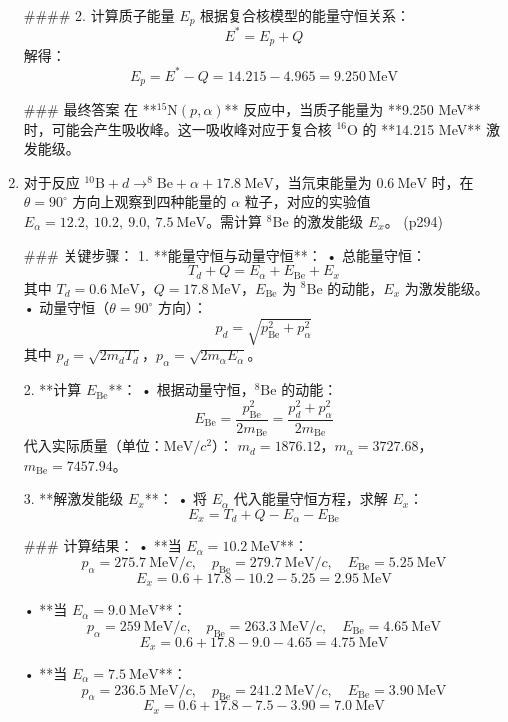 \documentclass{article}
\begin{document}
\begin{enumerate}
#### 2. 计算质子能量 \(E_p\)
根据复合核模型的能量守恒关系：
\[
E^* = E_p + Q
\]
解得：
\[
E_p = E^* - Q = 14.215 - 4.965 = 9.250 \, \text{MeV}
\]


### 最终答案
在 **\(^{15}\text{N}(p, \alpha)\)** 反应中，当质子能量为 **9.250 MeV** 时，可能会产生吸收峰。这一吸收峰对应于复合核 \(^{16}\text{O}\) 的 **14.215 MeV** 激发能级。
\item
对于反应 \(^{10}\text{B} + d \rightarrow ^{8}\text{Be} + \alpha + 17.8\ \text{MeV}\)，当氘束能量为 \(0.6\ \text{MeV}\) 时，在 \(\theta = 90^\circ\) 方向上观察到四种能量的 \(\alpha\) 粒子，对应的实验值 \(E_\alpha = 12.2,\ 10.2,\ 9.0,\ 7.5\ \text{MeV}\)。需计算 \(^{8}\text{Be}\) 的激发能级 \(E_x\)。   (p294)

### 关键步骤：
1. **能量守恒与动量守恒**：
   • 总能量守恒：  
     \[
     T_d + Q = E_\alpha + E_{\text{Be}} + E_x
     \]
     其中 \(T_d = 0.6\ \text{MeV}\)，\(Q = 17.8\ \text{MeV}\)，\(E_{\text{Be}}\) 为 \(^{8}\text{Be}\) 的动能，\(E_x\) 为激发能级。
   • 动量守恒（\(\theta = 90^\circ\) 方向）：  
     \[
     p_d = \sqrt{p_{\text{Be}}^2 + p_\alpha^2}
     \]
     其中 \(p_d = \sqrt{2 m_d T_d}\)，\(p_\alpha = \sqrt{2 m_\alpha E_\alpha}\)。

2. **计算 \(E_{\text{Be}}\)**：
   • 根据动量守恒，\(^{8}\text{Be}\) 的动能：  
     \[
     E_{\text{Be}} = \frac{p_{\text{Be}}^2}{2 m_{\text{Be}}} = \frac{p_d^2 + p_\alpha^2}{2 m_{\text{Be}}}
     \]
     代入实际质量（单位：\(\text{MeV}/c^2\)）：  
     \(m_d = 1876.12\)，\(m_\alpha = 3727.68\)，\(m_{\text{Be}} = 7457.94\)。

3. **解激发能级 \(E_x\)**：
   • 将 \(E_\alpha\) 代入能量守恒方程，求解 \(E_x\)：  
     \[
     E_x = T_d + Q - E_\alpha - E_{\text{Be}}
     \]

### 计算结果：
• **当 \(E_\alpha = 10.2\ \text{MeV}\)**：  
  \[
  p_\alpha = 275.7\ \text{MeV}/c, \quad p_{\text{Be}} = 279.7\ \text{MeV}/c, \quad E_{\text{Be}} = 5.25\ \text{MeV}
  \]
  \[
  E_x = 0.6 + 17.8 - 10.2 - 5.25 = 2.95\ \text{MeV}
  \]

• **当 \(E_\alpha = 9.0\ \text{MeV}\)**：  
  \[
  p_\alpha = 259\ \text{MeV}/c, \quad p_{\text{Be}} = 263.3\ \text{MeV}/c, \quad E_{\text{Be}} = 4.65\ \text{MeV}
  \]
  \[
  E_x = 0.6 + 17.8 - 9.0 - 4.65 = 4.75\ \text{MeV}
  \]

• **当 \(E_\alpha = 7.5\ \text{MeV}\)**：  
  \[
  p_\alpha = 236.5\ \text{MeV}/c, \quad p_{\text{Be}} = 241.2\ \text{MeV}/c, \quad E_{\text{Be}} = 3.90\ \text{MeV}
  \]
  \[
  E_x = 0.6 + 17.8 - 7.5 - 3.90 = 7.0\ \text{MeV}
  \]


\end{enumerate}
\end{document}

